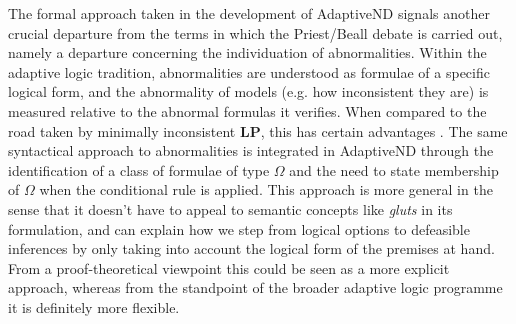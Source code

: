 \documentclass[]{article}
\newtheorem{definition}{Definition}
\newcommand{\TurnADND}[2]
    { {#1}\vdash_{\textbf{\sf AdaptiveND}}  {#2}}
\newcommand{\TurnChecked}[2]
    { {#1}\vdash_{\textbf{\sf \checked}}  {#2}}
\begin{document}
The formal approach taken in the development of \textsf{AdaptiveND} signals another crucial departure from the terms in which the Priest/Beall debate is carried out, namely a departure concerning the individuation of abnormalities. Within the adaptive logic tradition, abnormalities are understood as formulae of a specific logical form, and the abnormality of models (e.g. how inconsistent they are) is measured relative to the abnormal formulas it verifies. When compared to the road taken by minimally inconsistent \textbf{LP}, this has certain advantages \cite{Batens:Synthese:2000}. The same syntactical approach to abnormalities is integrated in \textsf{AdaptiveND} through the identification of a class of formulae of type $\Omega$ and the need to state membership of $\Omega$ when the conditional rule is applied. This approach is more general in the sense that it doesn't have to appeal to semantic concepts like \emph{gluts} in its formulation, and can explain how we step from logical options to defeasible inferences by only taking into account the logical form of the premises at hand. From a proof-theoretical viewpoint this could be seen as a more explicit approach, whereas from the standpoint of the broader adaptive logic programme it is definitely more flexible.

%
\end{document}
